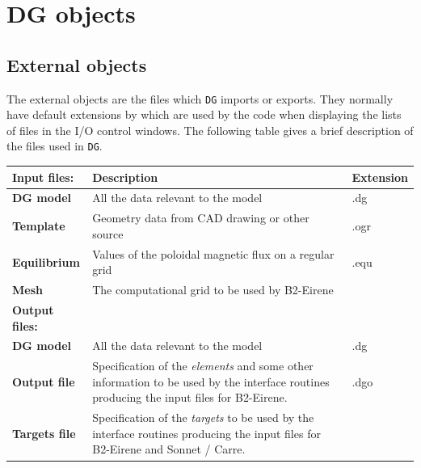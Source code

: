 \documentclass[12pt]{report}
\begin{document}
\section{DG objects}

\subsection{External objects}

The external objects are the files which \verb!DG! imports or exports. They
normally have default extensions by which are used by the code when
displaying the lists of files in the I/O control windows. The
following table gives a brief description of the files used in \verb!DG!.

{\raggedright
\renewcommand{\arraystretch}{1.5}
\vspace{3pt} \noindent
\begin{tabular}{|p{113pt}p{200pt}p{59pt}|}
\hline
\parbox{113pt}{\raggedright 
\textbf{Input files:}
} & {\centering 
\textbf{Description}
} & \parbox{59pt}{\centering 
\textbf{Extension}
} \\
\hline
\parbox{113pt}{\centering 
\textbf{DG model}
} & 
All the data relevant to the model
& \parbox{59pt}{\centering 
.dg
} \\
\parbox{113pt}{\centering 
\textbf{Template}
} & 
Geometry data from CAD drawing or other source
& \parbox{59pt}{\centering 
.ogr
} \\
\parbox{113pt}{\centering 
\textbf{Equilibrium}
} & 
Values of the poloidal magnetic flux on a regular grid
& \parbox{59pt}{\centering 
.equ
} \\
\parbox{113pt}{\centering 
\textbf{Mesh}
} & 
The computational grid to be used by B2-Eirene
& \parbox{59pt}{\raggedright 
~
} \\
\hline
\parbox{113pt}{\raggedright 
\textbf{Output files:}
} & 
~
& \parbox{59pt}{\raggedright 
~
} \\
\hline
\parbox{113pt}{\centering 
\textbf{DG model}
} & 
All the data relevant to the model
& \parbox{59pt}{\centering 
.dg
} \\
\parbox{113pt}{\centering 
\textbf{Output file}
} &
Specification of the \textit{elements} and some other information
\textendash{} to be used by the interface routines producing the input
files for B2-Eirene.
& \parbox{59pt}{\centering 
.dgo
} \\
\parbox{113pt}{\centering 
\textbf{Targets file}
} &
Specification of the \textit{targets} \textendash{} to be used by the
interface routines producing the input files for B2-Eirene and Sonnet / Carre.

\end{tabular}}
\end{document}
